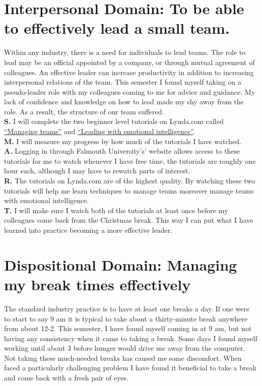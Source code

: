 \documentclass{scrartcl}
\begin{document}
\section{Interpersonal Domain: To be able to effectively lead a small team.}
 Within any industry, there is a need for individuals to lead teams. The role to lead may be an official appointed by a company, or through mutual agreement of colleagues. An effective leader can increase productivity in addition to increasing interpersonal relations of the team. This semester I found myself taking on a pseudo-leader role with my colleagues coming to me for advice and guidance. My lack of confidence and knowledge on how to lead made my shy away from the role. As a result, the structure of our team suffered.\\
\textbf{S.} I will complete the two beginner level tutorials on Lynda.com called \href{https://www.lynda.com/course-tutorials/Managing-Teams-2018/746304-2.html}{``Managing teams''} and  \href{https://www.lynda.com/Leadership-Management-tutorials/Inspirational-leadership/756283/5006410-4.html}{``Leading with emotional intelligence''}. \\
\textbf{M.}  I will measure my progress by how much of the tutorials I have watched. \\
\textbf{A.}  Logging in through Falmouth University's' website allows access to these tutorials for me to watch whenever I have free time, the tutorials are roughly one hour each, although I may have to rewatch parts of interest.\\
\textbf{R.} The tutorials on Lynda.com are of the highest quality. By watching these two tutorials will help me learn techniques to manage teams moreover manage teams with emotional intelligence. \\
\textbf{T.} I will make sure I watch both of the tutorials at least once before my colleagues come back from the Christmas break. This way I can put what I have learned into practice becoming a more effective leader.\\

\section{Dispositional Domain: Managing my break times effectively}
The standard industry practice is to have at least one breaks a day. If one were to start to say 9 am it is typical to take about a thirty-minute break anywhere from about 12-2. This semester, I have found myself coming in at 9 am, but not having any consistency when it came to taking a break. Some days I found myself working until about 3 before hunger would drive me away from the computer. Not taking these much-needed breaks has caused me some discomfort. When faced a particularly challenging problem I have found it beneficial to take a break and come back with a fresh pair of eyes. \\
\end{document}
